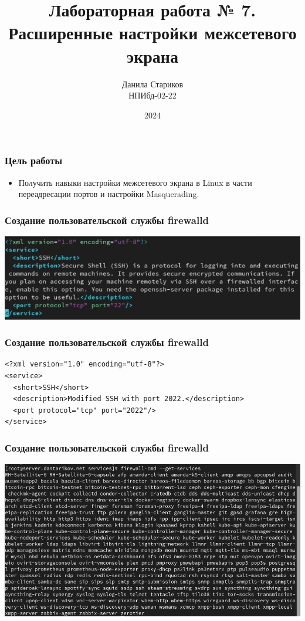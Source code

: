 

\title{Лабораторная работа № 7. \\ Расширенные настройки межсетевого экрана}
\author{Данила Стариков \\ НПИбд-02-22}
\date{2024}



\frame{\titlepage}

\begin{frame}
\frametitle{Цель работы}
\begin{itemize}
    \item Получить навыки настройки межсетевого экрана в Linux в части переадресации портов и настройки Masquerading.
\end{itemize}
\end{frame}

\begin{frame}
\frametitle{Создание пользовательской службы firewalld}
    \includegraphics[width=\textwidth]{../images/image00.png}
\end{frame}

\begin{frame}[containsverbatim]
\frametitle{Создание пользовательской службы firewalld}
\begin{verbatim}
<?xml version="1.0" encoding="utf-8"?>
<service>
  <short>SSH</short>
  <description>Modified SSH with port 2022.</description>
  <port protocol="tcp" port="2022"/>
</service>
\end{verbatim}
\end{frame}

\begin{frame}
\frametitle{Создание пользовательской службы firewalld}
    \includegraphics[width=\textwidth]{../images/image01.png}
\end{frame}

